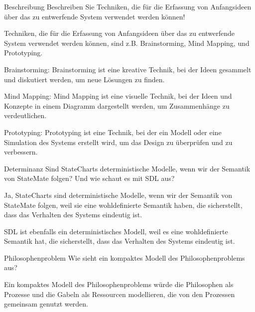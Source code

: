 \documentclass{article}
\begin{document}
\begin{exercise}{Beschreibung}
  Beschreiben Sie Techniken, die für die Erfassung von Anfangsideen über das zu entwerfende System verwendet werden können!

  \begin{solution}
    Techniken, die für die Erfassung von Anfangsideen über das zu entwerfende System verwendet werden können, sind z.B. Brainstorming, Mind Mapping, und Prototyping.

    Brainstorming: Brainstorming ist eine kreative Technik, bei der Ideen gesammelt und diskutiert werden, um neue Lösungen zu finden.

    Mind Mapping: Mind Mapping ist eine visuelle Technik, bei der Ideen und Konzepte in einem Diagramm dargestellt werden, um Zusammenhänge zu verdeutlichen.

    Prototyping: Prototyping ist eine Technik, bei der ein Modell oder eine Simulation des Systems erstellt wird, um das Design zu überprüfen und zu verbessern.
  \end{solution}
\end{exercise}

\begin{exercise}{Determinanz}
  Sind StateCharts deterministische Modelle, wenn wir der Semantik von StateMate folgen? Und wie schaut es mit SDL aus?

  \begin{solution}
    Ja, StateCharts sind deterministische Modelle, wenn wir der Semantik von StateMate folgen, weil sie eine wohldefinierte Semantik haben, die sicherstellt, dass das Verhalten des Systems eindeutig ist.

    SDL ist ebenfalls ein deterministisches Modell, weil es eine wohldefinierte Semantik hat, die sicherstellt, dass das Verhalten des Systems eindeutig ist.
  \end{solution}
\end{exercise}

\begin{exercise}{Philosophenproblem}
  Wie sieht ein kompaktes Modell des Philosophenproblems aus?

  \begin{solution}
    Ein kompaktes Modell des Philosophenproblems würde die Philosophen als Prozesse und die Gabeln als Ressourcen modellieren, die von den Prozessen gemeinsam genutzt werden.
  \end{solution}
\end{exercise}
\end{document}
